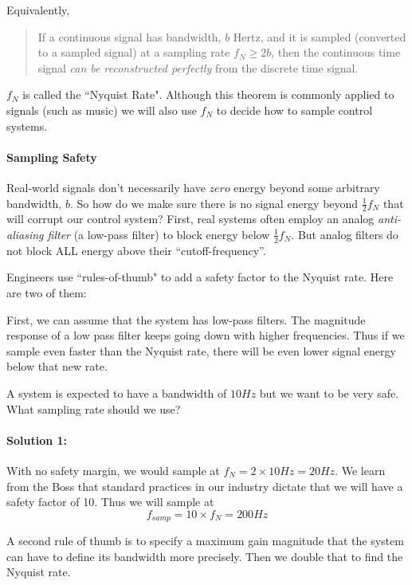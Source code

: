 Equivalently,

\begin{quotation}
  If a continuous signal has bandwidth, $b$ Hertz, and it is sampled (converted to a sampled signal) at a sampling rate
$f_N \geq  2b$, then the continuous time signal {\it can be reconstructed perfectly} from the discrete time signal.
\end{quotation}

$f_N$ is called the ``Nyquist Rate".   Although this theorem is commonly applied to signals (such as music)
we will also use $f_N$ to decide how to sample control systems.

\paragraph{Sampling Safety}
Real-world signals don't necessarily have $zero$ energy beyond some arbitrary bandwidth, $b$.   So how do we make sure there is no signal
energy beyond $\frac{1}{2}f_N$  that will corrupt our control system?    First, real systems often employ an analog {\it anti-aliasing filter}
(a low-pass filter) to block energy below $\frac{1}{2}f_N$.  But analog filters do not
block ALL energy above their ``cutoff-frequency''.

Engineers use ``rules-of-thumb" to add a safety factor to the Nyquist rate.   Here are two of them:

First, we can assume that the system has low-pass filters.  The magnitude response of a low pass filter keeps going down with higher frequencies.
Thus if we sample even faster than the Nyquist rate, there will be even lower signal energy below that new rate.

\begin{ExampleSmall}
A system is expected to have a bandwidth of $10Hz$ but we want to be very safe.   What sampling rate should we use?

\paragraph{Solution 1:}   With no safety margin, we would sample at $f_N  = 2\times10Hz = 20Hz$.   We learn from the Boss that standard practices
in our industry dictate that we will have a safety factor of 10.   Thus we will sample at
\[
f_{samp} = 10\times f_N = 200Hz
\]
\end{ExampleSmall}

A second rule of thumb is to specify a maximum gain magnitude that the system can have to define its bandwidth more precisely.  Then we double that to find the
Nyquist rate.

